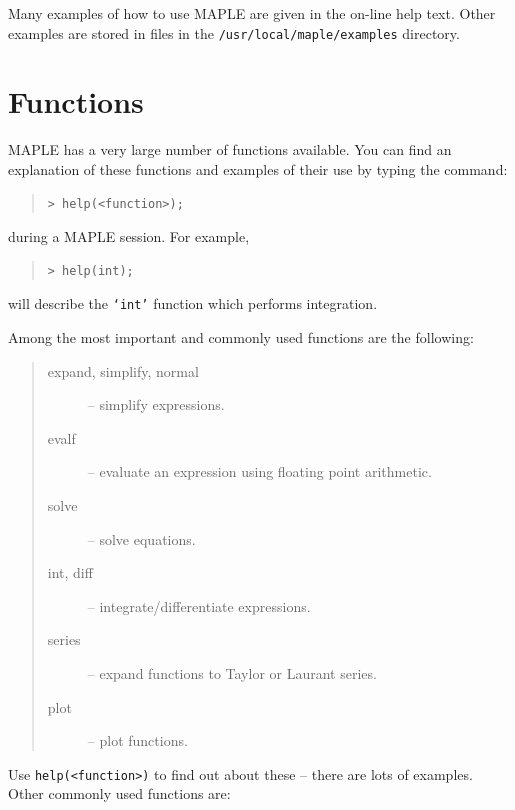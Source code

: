 \documentclass[twoside,11pt]{article}
\newcommand{\xlabel}[1]{}
\begin{document}
Many examples of how to use MAPLE are given in the on-line help text.
Other examples are stored in files in the \texttt{/usr/local/maple/examples}
directory.

\section{Functions\xlabel{functions}}

MAPLE has a very large number of functions available. You can find an
explanation of these functions and examples of their use by typing the
command:

\begin{quote}\begin{verbatim}
> help(<function>);
\end{verbatim}\end{quote}

during a MAPLE session. For example,

\begin{quote}\begin{verbatim}
> help(int);
\end{verbatim}\end{quote}

will describe the \texttt{`int'} function which performs integration.

Among the most important and commonly used functions are the following:

\begin{quote}
\begin{description}

\item [expand, simplify, normal] -- simplify expressions.
\item [evalf] -- evaluate an expression using floating point arithmetic.
\item [solve] -- solve equations.
\item [int, diff] -- integrate/differentiate expressions.
\item [series] -- expand functions to Taylor or Laurant series.
\item [plot] -- plot functions.

\end{description}
\end{quote}

Use \verb+help(<function>)+ to find out about these -- there are lots of
examples. Other commonly used functions are:
\end{document}
